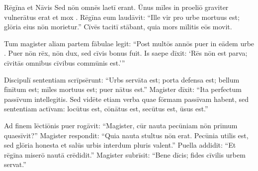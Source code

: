 \documentclass[12pt]{nextbook}
\begin{document}
\begin{readersection}{Rēgīna et Nāvis}
Sed nōn omnēs laetī erant. Ūnus mīles in proeliō graviter vulnerātus erat et mox . Rēgīna eum laudāvit: “Ille vir pro urbe mortuus est; glōria eius nōn morietur.” Cīvēs tacitī stābant, quia mors mīlitis eōs movit.

Tum magister aliam partem fābulae legit: “Post multōs annōs puer in eādem urbe . Puer nōn rēx, nōn dux, sed cīvis bonus fuit. Is saepe dīxit: ‘Rēs  nōn est parva; cīvitās omnibus cīvibus commūnis est.’”

Discipulī sententiam scrīpsērunt: “Urbs servāta est; porta defensa est; bellum fīnītum est; mīles mortuus est; puer nātus est.” Magister dīxit: “Ita perfectum passīvum intellegitis. Sed vidēte etiam verba quae fōrmam passīvam habent, sed sententiam actīvam: locūtus est, cōnātus est, secūtus est, ūsus est.”

Ad finem lēctiōnis puer rogāvit: “Magister, cūr nauta pecūniam nōn prīmum quaesīvit?” Magister respondit: “Quia nauta stultus nōn erat. Pecūnia utilis est, sed glōria honesta et salūs urbis interdum pluris valent.” Puella addidit: “Et rēgīna miserō nautā crēdidit.” Magister subrīsit: “Bene dīcis; fides cīvilis urbem servat.”

\end{readersection}
\end{document}
